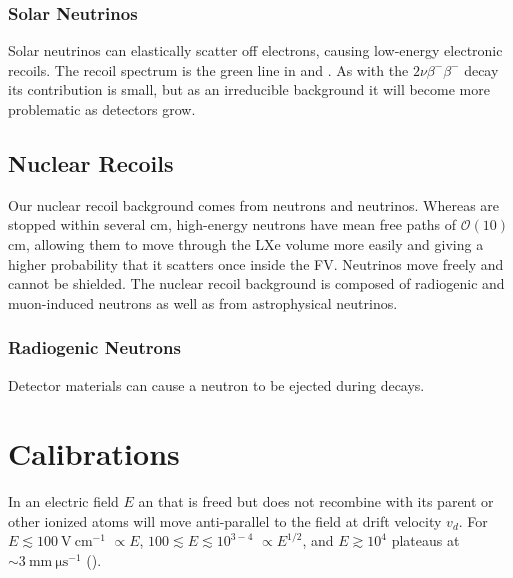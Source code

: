 \subsubsection{Solar Neutrinos}
\label{subsubsec:backgrounds_electronic_solar_neutrinos}
Solar neutrinos can elastically scatter off electrons, causing low-energy electronic recoils.  The recoil spectrum is the green line in
 and .  As with the  $2 \nu \beta^- \beta^-$
decay its contribution is small, but as an irreducible background it will become more problematic as detectors grow.



\subsection{Nuclear Recoils}
\label{subsec:backgrounds_nuclear}
Our nuclear recoil background comes from neutrons and neutrinos.  Whereas \gammarays are stopped within several cm, high-energy neutrons
have mean free paths of $\mathcal{O}(10)$ cm, allowing them to move through the LXe volume more easily and giving a higher probability
that it scatters once inside the FV.  Neutrinos move freely and cannot be shielded.  The nuclear recoil background is composed of
radiogenic and muon-induced neutrons as well as from astrophysical neutrinos.

\subsubsection{Radiogenic Neutrons}
\label{subsubsec:backgrounds_nuclear_radiogenic}
Detector materials can cause a neutron to be ejected during decays.



\section{Calibrations}
\label{sec:calibrations}



In an electric field $E$ an \electron that is freed but does not recombine with its parent or other ionized atoms will move anti-parallel
to the field at drift velocity $v_{d}$.  For $E \lesssim 100\ \mathrm{V\ cm^{-1}}$ \vd$\propto E$, $100 \lesssim E \lesssim 10^{3-4}$
\vd$\propto E^{1/2}$, and $E \gtrsim 10^{4}$ \vd plateaus at $\sim 3\ \mathrm{mm\ \mu s^{-1}}$ ().

